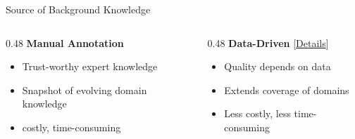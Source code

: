\begin{frame}{Source of Background Knowledge}
    \hypertarget{main:sources-background-knowledge}{}

\begin{columns}[T,onlytextwidth]
\begin{column}{0.48\textwidth}
\textbf{Manual Annotation}
\begin{itemize}
    \item[+]<2-> Trust-worthy expert knowledge
    \item[--]<3-> Snapshot of evolving domain knowledge
    \item[--]<4-> costly, time-consuming
\end{itemize}
\end{column}

\begin{column}{0.48\textwidth}
\textbf{Data-Driven} {\tiny[\hyperlink{appendix:data-driven-related-work}{Details}]}
\begin{itemize}
    \item[--]<2-> Quality depends on data
    \item[+]<3-> Extends coverage of domains
    \item[+]<4-> Less costly, less time-consuming
\end{itemize}
\end{column}
\end{columns}

\vspace{0.5em}

\end{frame}


